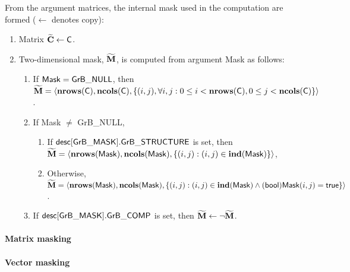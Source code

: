 From the argument matrices, the internal mask used in 
the computation are formed ($\leftarrow$ denotes copy):
\begin{enumerate}
	\item Matrix ${\bf \widetilde{C}} \leftarrow {\sf C}$.

	\item Two-dimensional mask, ${\bf \widetilde{M}}$, is computed from
    argument {\sf Mask} as follows:
	\begin{enumerate}
		\item If ${\sf Mask} = {\sf GrB\_NULL}$, then ${\bf \widetilde{M}} = 
        \langle \bold{nrows}({\sf C}), \bold{ncols}({\sf C}), \{(i,j), 
        \forall i,j : 0 \leq i <  \bold{nrows}({\sf C}), 0 \leq j < 
        \bold{ncols}({\sf C}) \} \rangle$.

		\item If {\sf Mask} $\ne$ {\sf GrB\_NULL},
        \begin{enumerate}
            \item If ${\sf desc[GrB\_MASK].GrB\_STRUCTURE}$ is set, then 
            ${\bf \widetilde{M}} = \langle \bold{nrows}({\sf Mask}), 
            \bold{ncols}({\sf Mask}), \{(i,j) : (i,j) \in \bold{ind}({\sf Mask}) \} \rangle$,
            \item Otherwise, ${\bf \widetilde{M}} = \langle \bold{nrows}({\sf Mask}), 
            \bold{ncols}({\sf Mask}), \\ \{(i,j) : (i,j) \in \bold{ind}({\sf Mask}) \wedge 
            ({\sf bool}){\sf Mask}(i,j) = {\sf true}\} \rangle$.
        \end{enumerate}

		\item	If ${\sf desc[GrB\_MASK].GrB\_COMP}$ is set, then 
        ${\bf \widetilde{M}} \leftarrow \neg {\bf \widetilde{M}}$.
	\end{enumerate}
\end{enumerate}

\paragraph{Matrix masking}




\paragraph{Vector masking}

